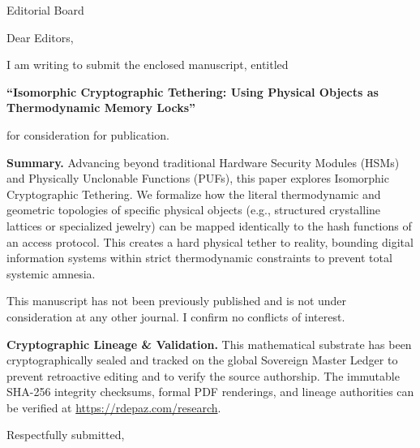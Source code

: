 \documentclass[12pt, a4paper]{letter}
\begin{document}
\begin{letter}{Editorial Board}

\opening{Dear Editors,}

I am writing to submit the enclosed manuscript, entitled

\begin{center}
\textbf{``Isomorphic Cryptographic Tethering: Using Physical Objects as Thermodynamic Memory Locks''}
\end{center}

\noindent for consideration for publication.

\medskip

\textbf{Summary.} Advancing beyond traditional Hardware Security Modules (HSMs) and Physically Unclonable Functions (PUFs), this paper explores Isomorphic Cryptographic Tethering. We formalize how the literal thermodynamic and geometric topologies of specific physical objects (e.g., structured crystalline lattices or specialized jewelry) can be mapped identically to the hash functions of an access protocol. This creates a hard physical tether to reality, bounding digital information systems within strict thermodynamic constraints to prevent total systemic amnesia.

\medskip

This manuscript has not been previously published and is not under consideration
at any other journal. I confirm no conflicts of interest.

\textbf{Cryptographic Lineage \& Validation.} This mathematical substrate has been cryptographically sealed and tracked on the global Sovereign Master Ledger to prevent retroactive editing and to verify the source authorship. The immutable SHA-256 integrity checksums, formal PDF renderings, and lineage authorities can be verified at \url{https://rdepaz.com/research}.

\medskip

\closing{Respectfully submitted,}
\end{letter}
\end{document}
